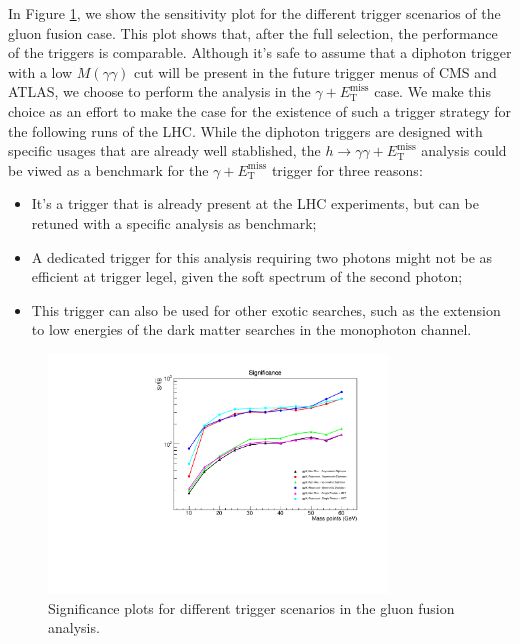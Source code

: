 \documentclass[11pt]{article}
\newcommand{\MET}{\ensuremath{E_{\mathrm{T}}^{\mathrm{miss}}}\xspace}
\begin{document}
In Figure \ref{fig:triggers}, we show the sensitivity plot for the different trigger scenarios of the gluon fusion case.
This plot shows that, after the full selection, the performance of the triggers is comparable. Although it's safe to assume that a diphoton trigger with a low $M(\gamma\gamma)$ cut will be present in the future trigger menus of CMS and ATLAS, we choose to perform the analysis in the $\gamma+\MET$ case. We make this choice as an effort to make the case for the existence of such a trigger strategy for the following runs of the LHC. While the diphoton triggers are designed with specific usages that are already well stablished, the $h\rightarrow\gamma\gamma+\MET$ analysis could be viwed as a benchmark for the $\gamma+\MET$ trigger for three reasons:
\begin{itemize}
    \item It's a trigger that is already present at the LHC experiments, but can be retuned with a specific analysis as benchmark;
    \item A dedicated trigger for this analysis requiring two photons might not be as efficient at trigger legel, given the soft spectrum of the second photon;
    \item This trigger can also be used for other exotic searches, such as the extension to low energies of the dark matter searches in the monophoton channel.
\end{itemize}

\begin{figure}[htbp]
\centering
\includegraphics[height=2.5in]{triggerplots/Significance.pdf}\caption{Significance plots for different trigger scenarios in the gluon fusion analysis.}
\label{fig:triggers}
\end{figure}
\end{document}
